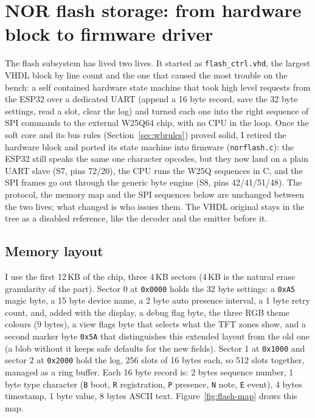 \documentclass[a4paper,11pt]{article}
\begin{document}
\section{NOR flash storage: from hardware block to firmware driver}
\label{sec:flashctrl}

The flash subsystem has lived two lives. It started as \texttt{flash\_ctrl.vhd},
the largest VHDL block by line count and the one that caused the most trouble on
the bench: a self contained hardware state machine that took high level requests
from the ESP32 over a dedicated UART (append a 16 byte record, save the 32 byte
settings, read a slot, clear the log) and turned each one into the right sequence
of SPI commands to the external W25Q64 chip, with no CPU in the loop. Once the
soft core and its bus rules (Section~\ref{sec:wbrules}) proved solid, I retired
the hardware block and ported its state machine into firmware
(\texttt{norflash.c}): the ESP32 still speaks the same one character opcodes, but
they now land on a plain UART slave (S7, pins 72/20), the CPU runs the W25Q
sequences in C, and the SPI frames go out through the generic byte engine (S8,
pins 42/41/51/48). The protocol, the memory map and the SPI sequences below are
unchanged between the two lives; what changed is who issues them. The VHDL
original stays in the tree as a disabled reference, like the decoder and the
emitter before it.

\subsection{Memory layout}

I use the first 12\,KB of the chip, three 4\,KB sectors (4\,KB is the natural erase
granularity of the part). Sector 0 at \texttt{0x0000} holds the 32 byte settings:
a \texttt{0xA5} magic byte, a 15 byte device name, a 2 byte auto presence
interval, a 1 byte retry count, and, added with the display, a debug flag byte,
the three RGB theme colours (9 bytes), a view flags byte that selects what the
TFT zones show, and a second marker byte \texttt{0x5A} that distinguishes this
extended layout from the old one (a blob without it keeps safe defaults for the
new fields). Sector 1 at \texttt{0x1000} and sector 2 at
\texttt{0x2000} hold the log, 256 slots of 16 bytes each, so 512 slots together,
managed as a ring buffer. Each 16 byte record is: 2 bytes sequence number, 1 byte
type character (\texttt{B} boot, \texttt{R} registration, \texttt{P} presence,
\texttt{N} note, \texttt{E} event), 4 bytes timestamp, 1 byte value, 8 bytes ASCII
text. Figure~\ref{fig:flash-map} draws this map.
\end{document}
